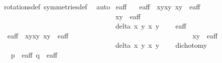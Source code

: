 \begin{isabellebody}
\ rotations{\isacharunderscore}def\ symmetries{\isacharunderscore}def\ \isamarkupfalse%
\ auto%
\endisatagproof
{\isafoldproof}%
%
\isadelimproof
\isanewline
%
\endisadelimproof
\isanewline
{}\isamarkupfalse%
\ e{\isacharunderscore}aff{\isacharunderscore}{}\ \isanewline
\ \ {\isachardoublequoteopen}e{\isacharunderscore}aff{\isacharunderscore}{}\ {\isacharequal}\ {\isacharbraceleft}{\isacharparenleft}{\isacharparenleft}x{}{\isacharcomma}y{}{\isacharparenright}{\isacharcomma}{\isacharparenleft}x{}{\isacharcomma}y{}{\isacharparenright}{\isacharparenright}{\isachardot}\ {\isacharparenleft}x{}{\isacharcomma}y{}{\isacharparenright}\ {\isasymin}\ e{\isacharunderscore}aff\ {\isasymand}\ \isanewline
\ \ \ \ \ \ \ \ \ \ \ \ \ \ \ \ \ \ \ \ \ \ \ \ \ \ \ \ \ \ \ \ \ {\isacharparenleft}x{}{\isacharcomma}y{}{\isacharparenright}\ {\isasymin}\ e{\isacharunderscore}aff\ {\isasymand}\ \isanewline
\ \ \ \ \ \ \ \ \ \ \ \ \ \ \ \ \ \ \ \ \ \ \ \ \ \ \ \ \ \ \ \ \ delta\ x{}\ y{}\ x{}\ y{}\ {\isasymnoteq}\ {}\ {\isacharbraceright}{\isachardoublequoteclose}\isanewline
\isanewline
{}\isamarkupfalse%
\ e{\isacharunderscore}aff{\isacharunderscore}{}\ \isanewline
\ \ {\isachardoublequoteopen}e{\isacharunderscore}aff{\isacharunderscore}{}\ {\isacharequal}\ {\isacharbraceleft}{\isacharparenleft}{\isacharparenleft}x{}{\isacharcomma}y{}{\isacharparenright}{\isacharcomma}{\isacharparenleft}x{}{\isacharcomma}y{}{\isacharparenright}{\isacharparenright}{\isachardot}\ {\isacharparenleft}x{}{\isacharcomma}y{}{\isacharparenright}\ {\isasymin}\ e{\isacharunderscore}aff\ {\isasymand}\ \isanewline
\ \ \ \ \ \ \ \ \ \ \ \ \ \ \ \ \ \ \ \ \ \ \ \ \ \ \ \ \ \ \ \ \ {\isacharparenleft}x{}{\isacharcomma}y{}{\isacharparenright}\ {\isasymin}\ e{\isacharunderscore}aff\ {\isasymand}\ \isanewline
\ \ \ \ \ \ \ \ \ \ \ \ \ \ \ \ \ \ \ \ \ \ \ \ \ \ \ \ \ \ \ \ \ delta{\isacharprime}\ x{}\ y{}\ x{}\ y{}\ {\isasymnoteq}\ {}\ {\isacharbraceright}{\isachardoublequoteclose}\isanewline
\isanewline
{}\isamarkupfalse%
\ dichotomy{\isacharunderscore}{}{\isacharcolon}\isanewline
\ \ \ {\isachardoublequoteopen}p\ {\isasymin}\ e{\isacharunderscore}aff{\isachardoublequoteclose}\ {\isachardoublequoteopen}q\ {\isasymin}\ e{\isacharunderscore}aff{\isachardoublequoteclose}\ \isanewline

\end{isabellebody}

